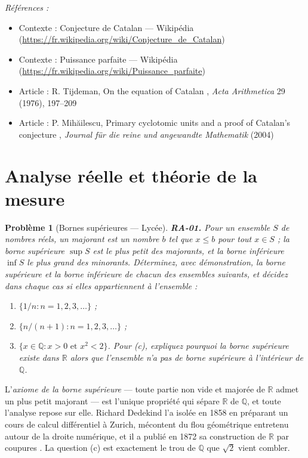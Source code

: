 \documentclass[11pt]{article}
\newtheorem{problem}{Problème}
\newenvironment{refs}{\par\small\noindent\emph{Références :}\begin{itemize}\setlength\itemsep{0pt}}{\end{itemize}\normalsize}
\begin{document}
\begin{refs}
\item Contexte : Conjecture de Catalan --- Wikipédia (\url{https://fr.wikipedia.org/wiki/Conjecture_de_Catalan})
\item Contexte : Puissance parfaite --- Wikipédia (\url{https://fr.wikipedia.org/wiki/Puissance_parfaite})
\item Article : R. Tijdeman, \og{} On the equation of Catalan \fg{}, \textit{Acta Arithmetica} 29 (1976), 197--209
\item Article : P. Mih\u{a}ilescu, \og{} Primary cyclotomic units and a proof of Catalan's conjecture \fg{}, \textit{Journal für die reine und angewandte Mathematik} (2004)
\end{refs}

\bigskip


\section*{Analyse réelle et théorie de la mesure}

\begin{problem}[{Bornes supérieures --- Lycée}]
\textbf{RA-01.} Pour un ensemble $ S $ de nombres réels, un \textit{majorant}
est un nombre $ b $ tel que $ x \le b $ pour tout $ x \in S $ ; la \textit{borne supérieure}
$ \sup S $ est le plus petit des majorants, et la \textit{borne inférieure} $ \inf S $ le plus
grand des minorants. Déterminez, avec démonstration, la borne supérieure et la borne inférieure de
chacun des ensembles suivants, et décidez dans chaque cas si elles appartiennent à l'ensemble :
\begin{enumerate}
\item[(a)] $ \{ 1/n : n = 1, 2, 3, \dots \} $ ;
\item[(b)] $ \{ n/(n+1) : n = 1, 2, 3, \dots \} $ ;
\item[(c)] $ \{ x \in \mathbb{Q} : x > 0 \text{ et } x^2 < 2 \} $.
Pour (c), expliquez pourquoi la borne supérieure existe dans $ \mathbb{R} $ alors que l'ensemble
n'a pas de borne supérieure à l'intérieur de $ \mathbb{Q} $.
\end{enumerate}

\end{problem}

\noindent L'\textit{axiome de la borne supérieure} --- toute partie non vide et majorée de $\mathbb{R}$
admet un plus petit majorant --- est l'unique propriété qui sépare $\mathbb{R}$ de $\mathbb{Q}$, et toute l'analyse repose
sur elle. Richard Dedekind l'a isolée en 1858 en préparant un cours de calcul différentiel à
Zurich, mécontent du flou géométrique entretenu autour de la droite numérique, et il a publié en
1872 sa construction de $\mathbb{R}$ par \og{} coupures \fg{}. La question (c) est exactement le trou de $\mathbb{Q}$ que
$ \sqrt{2} $ vient combler.
\end{document}
